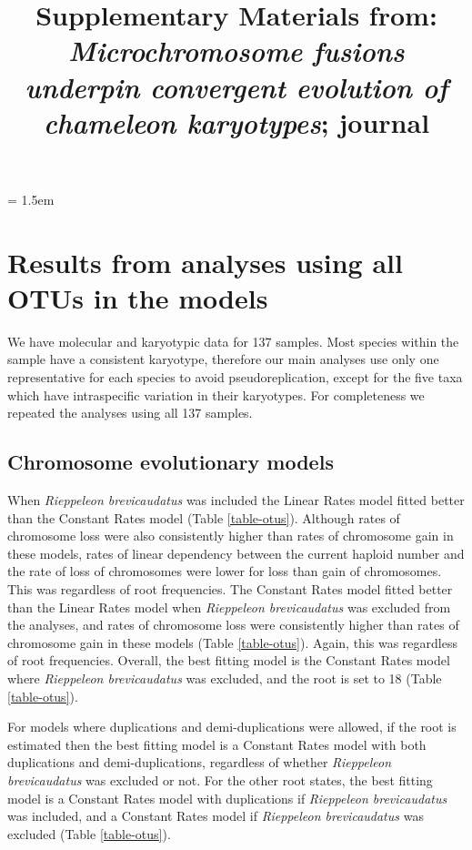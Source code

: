 \documentclass[a4paper, 12pt]{article}
\title{Supplementary Materials from: \textit{Microchromosome fusions underpin convergent evolution of chameleon karyotypes}; journal}
\author{}
\date{}
\begin{document}
\maketitle

\tableofcontents

\parindent = 1.5em
\addtolength{\parskip}{.3em}

\newpage
\section{Results from analyses using all OTUs in the models}

We have molecular and karyotypic data for 137 samples. Most species within the sample have a consistent karyotype, therefore our main analyses use only one representative for each species to avoid pseudoreplication, except for the five taxa which have intraspecific variation in their karyotypes. For completeness we repeated the analyses using all 137 samples.

\subsection{Chromosome evolutionary models}
When \textit{Rieppeleon brevicaudatus} was included the Linear Rates model fitted better than the Constant Rates model (Table \ref{table-otus}). Although rates of chromosome loss were also consistently higher than rates of chromosome gain in these models, rates of linear dependency between the current haploid number and the rate of loss of chromosomes were lower for loss than gain of chromosomes. This was regardless of root frequencies. The Constant Rates model fitted better than the Linear Rates model when \textit{Rieppeleon brevicaudatus} was excluded from the analyses, and rates of chromosome loss were consistently higher than rates of chromosome gain in these models (Table \ref{table-otus}). Again, this was regardless of root frequencies. Overall, the best fitting model is the Constant Rates model where \textit{Rieppeleon brevicaudatus} was excluded, and the root is set to 18 (Table \ref{table-otus}). 

\noindent For models where duplications and demi-duplications were allowed, if the root is estimated then the best fitting model is a Constant Rates model with both duplications and demi-duplications, regardless of whether \textit{Rieppeleon brevicaudatus} was excluded or not. For the other root states, the best fitting model is a Constant Rates model with duplications if \textit{Rieppeleon brevicaudatus} was included, and a Constant Rates model if \textit{Rieppeleon brevicaudatus} was excluded (Table \ref{table-otus}). 
\end{document}
